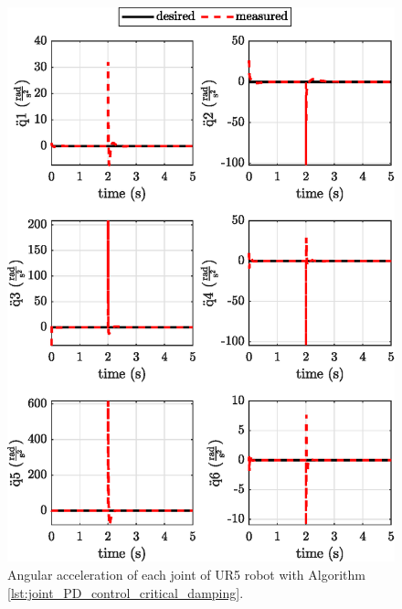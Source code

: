 \begin{figure}
    \centering
    \includegraphics{images/act_1.5/joint_acceleration.eps}
    \caption{Angular acceleration of each joint of UR5 robot with Algorithm \ref{lst:joint_PD_control_critical_damping}.}
    \label{fig:act_1.5_joint_acceleration}
\end{figure}


